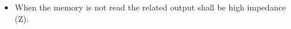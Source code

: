 \documentclass[a4paper,12pt]{article}
\begin{document}
\begin{itemize}


\item When the memory is not read the related output shall be high impedance (Z).
\end{itemize}
\end{document}
